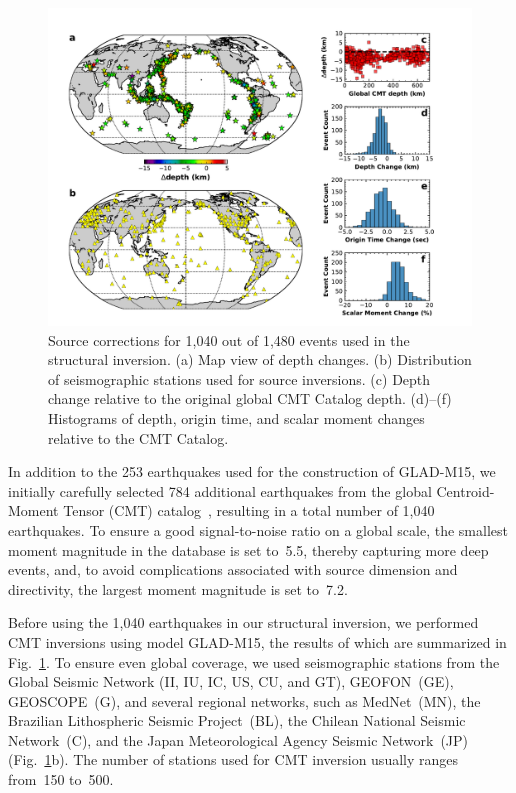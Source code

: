 \begin{figure}
  \centering
  \includegraphics[width=\textwidth]{ch-GLADM25/figures/source_corrections.pdf}
  \caption{\small{Source corrections for 1,040 out of 1,480 events used in the structural inversion. (a) Map view of depth changes. (b) Distribution of seismographic stations used for source inversions. (c) Depth change relative to the original global CMT Catalog depth. (d)--(f) Histograms of depth, origin time, and scalar moment changes relative to the CMT Catalog.
  }}
  \label{fig:source_correction}
\end{figure}

In addition to the 253 earthquakes used for the construction of GLAD-M15, we initially carefully selected 784 additional earthquakes
from the global Centroid-Moment Tensor (CMT) catalog~\cite{ekstrom2012global},
resulting in a total number of 1,040 earthquakes.
To ensure a good signal-to-noise ratio on a global scale,
the smallest moment magnitude in the database is set to~5.5,
thereby capturing more deep events,
and, to avoid complications associated with source dimension and directivity,
the largest moment magnitude is set to~7.2.

Before using the 1,040 earthquakes in our structural inversion,
we performed CMT inversions using model GLAD-M15,
the results of which are summarized in Fig.~\ref{fig:source_correction}.
To ensure even global coverage,
we used seismographic stations from the  Global Seismic Network (II, IU, IC, US, CU, and GT),
GEOFON~(GE), GEOSCOPE~(G), and several regional networks, such as MedNet~(MN),
the Brazilian Lithospheric Seismic Project~(BL), the Chilean National Seismic Network~(C),
and the Japan Meteorological Agency Seismic Network~(JP) (Fig.~\ref{fig:source_correction}b).
The number of stations used for CMT inversion usually ranges
from~150 to~500.

